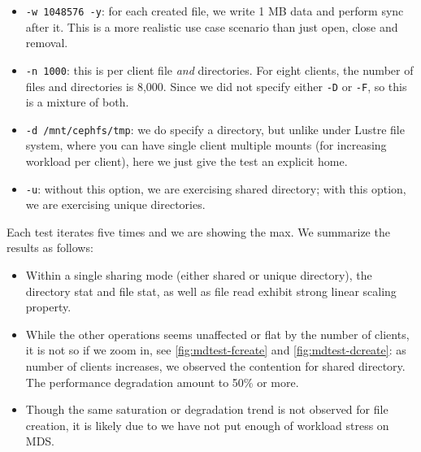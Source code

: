 \documentclass{article}
\begin{document}
\begin{itemize}
\item \verb!-w 1048576 -y!: for each created file, we write 1 MB data and
perform sync after it. This is a more realistic use case scenario than just
open, close and removal.

\item \verb!-n 1000!: this is per client file \textit{and} directories. For eight
clients, the number of files and directories is 8,000. Since we did not specify
either \verb!-D! or \verb!-F!, so this is a mixture of both.

\item \verb!-d /mnt/cephfs/tmp!: we do specify a directory, but unlike under
Lustre file system, where you can have single client multiple mounts (for
increasing workload per client), here we just give the test an explicit home.

\item \verb!-u!: without this option, we are exercising shared directory; with
this option, we are exercising unique directories.

\end{itemize}

Each test iterates five times and we are showing the max. 
We summarize the results as follows:


\begin{itemize}

\item Within a single sharing mode (either shared or unique directory), the
directory stat and file stat, as well as file read exhibit strong linear
scaling property. 

\item While the other operations seems unaffected or flat by the number of
clients, it is not so if we zoom in, see \ref{fig:mdtest-fcreate} and
\ref{fig:mdtest-dcreate}:  as number of clients increases, we observed the
contention for shared directory. The performance degradation amount to 50\% or
more.

\item Though the same saturation or degradation trend is not observed for file
creation, it is likely due to we have not put enough of workload stress on MDS.

\end{itemize}
\end{document}
